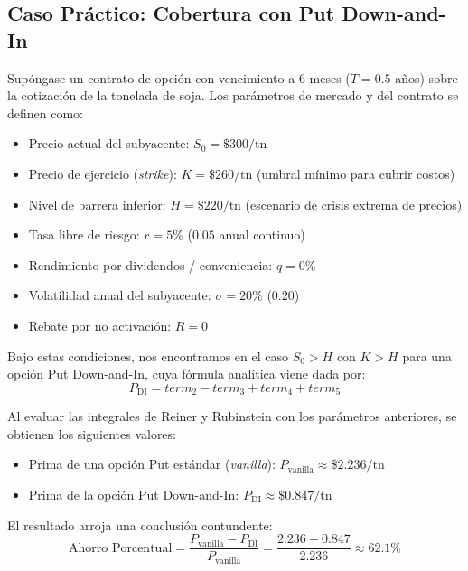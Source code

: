 \subsection{Caso Práctico: Cobertura con Put Down-and-In}

Supóngase un contrato de opción con vencimiento a 6 meses ($T = 0.5$ años) sobre la cotización de la tonelada de soja. Los parámetros de mercado y del contrato se definen como:
\begin{itemize}
    \item Precio actual del subyacente: $S_0 = \$300/\text{tn}$
    \item Precio de ejercicio (\textit{strike}): $K = \$260/\text{tn}$ (umbral mínimo para cubrir costos)
    \item Nivel de barrera inferior: $H = \$220/\text{tn}$ (escenario de crisis extrema de precios)
    \item Tasa libre de riesgo: $r = 5\%$ ($0.05$ anual continuo)
    \item Rendimiento por dividendos / conveniencia: $q = 0\%$
    \item Volatilidad anual del subyacente: $\sigma = 20\%$ ($0.20$)
    \item Rebate por no activación: $R = 0$
\end{itemize}

Bajo estas condiciones, nos encontramos en el caso $S_0 > H$ con $K > H$ para una opción Put Down-and-In, cuya fórmula analítica viene dada por:
\begin{equation}
P_{\text{DI}} = term_2 - term_3 + term_4 + term_5
\end{equation}

Al evaluar las integrales de Reiner y Rubinstein con los parámetros anteriores, se obtienen los siguientes valores:
\begin{itemize}
    \item Prima de una opción Put estándar (\textit{vanilla}): $P_{\text{vanilla}} \approx \$2.236/\text{tn}$
    \item Prima de la opción Put Down-and-In: $P_{\text{DI}} \approx \$0.847/\text{tn}$
\end{itemize}

El resultado arroja una conclusión contundente:
\begin{equation}
\text{Ahorro Porcentual} = \frac{P_{\text{vanilla}} - P_{\text{DI}}}{P_{\text{vanilla}}} = \frac{2.236 - 0.847}{2.236} \approx 62.1\%
\end{equation}

